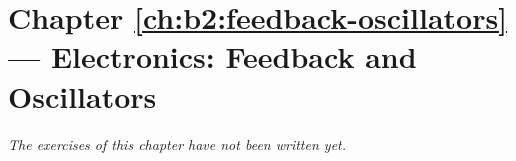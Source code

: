 \section*{Chapter \ref{ch:b2:feedback-oscillators} --- Electronics: Feedback and Oscillators}


\emph{The exercises of this chapter have not been written yet.}
